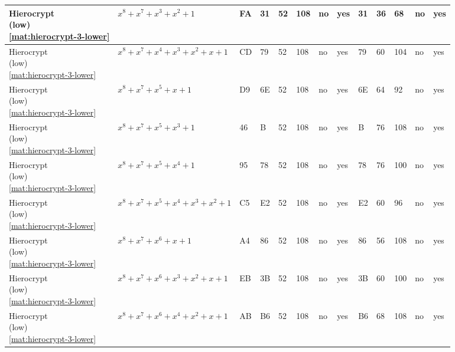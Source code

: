 \begin{tiny}
\begin{longtable}{|l|l|l|l|l|l|l|l|l|l|l|l|l|}
\shortstack{Hierocrypt \\ (low) \\ \eqref{mat:hierocrypt-3-lower}} & $x^8 + x^7 + x^3 + x^2 + 1$ & FA & 31 & 52 & 108 & no & yes & 31 & 36 & 68 & no & yes \\ \hline
\shortstack{Hierocrypt \\ (low) \\ \eqref{mat:hierocrypt-3-lower}} & $x^8 + x^7 + x^4 + x^3 + x^2 + x + 1$ & CD & 79 & 52 & 108 & no & yes & 79 & 60 & 104 & no & yes \\ \hline
\shortstack{Hierocrypt \\ (low) \\ \eqref{mat:hierocrypt-3-lower}} & $x^8 + x^7 + x^5 + x + 1$ & D9 & 6E & 52 & 108 & no & yes & 6E & 64 & 92 & no & yes \\ \hline
\shortstack{Hierocrypt \\ (low) \\ \eqref{mat:hierocrypt-3-lower}} & $x^8 + x^7 + x^5 + x^3 + 1$ & 46 & B & 52 & 108 & no & yes & B & 76 & 108 & no & yes \\ \hline
\shortstack{Hierocrypt \\ (low) \\ \eqref{mat:hierocrypt-3-lower}} & $x^8 + x^7 + x^5 + x^4 + 1$ & 95 & 78 & 52 & 108 & no & yes & 78 & 76 & 100 & no & yes \\ \hline
\shortstack{Hierocrypt \\ (low) \\ \eqref{mat:hierocrypt-3-lower}} & $x^8 + x^7 + x^5 + x^4 + x^3 + x^2 + 1$ & C5 & E2 & 52 & 108 & no & yes & E2 & 60 & 96 & no & yes \\ \hline
\shortstack{Hierocrypt \\ (low) \\ \eqref{mat:hierocrypt-3-lower}} & $x^8 + x^7 + x^6 + x + 1$ & A4 & 86 & 52 & 108 & no & yes & 86 & 56 & 108 & no & yes \\ \hline
\shortstack{Hierocrypt \\ (low) \\ \eqref{mat:hierocrypt-3-lower}} & $x^8 + x^7 + x^6 + x^3 + x^2 + x + 1$ & EB & 3B & 52 & 108 & no & yes & 3B & 60 & 100 & no & yes \\ \hline
\shortstack{Hierocrypt \\ (low) \\ \eqref{mat:hierocrypt-3-lower}} & $x^8 + x^7 + x^6 + x^4 + x^2 + x + 1$ & AB & B6 & 52 & 108 & no & yes & B6 & 68 & 108 & no & yes \\ \hline

\end{longtable}
\end{tiny}
